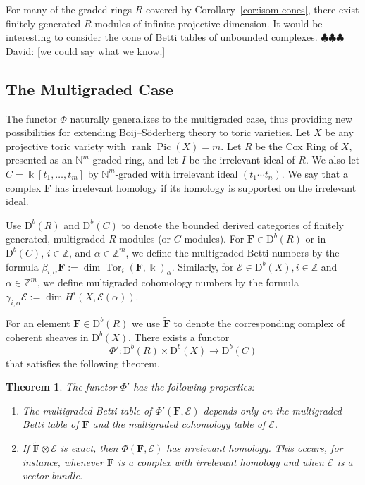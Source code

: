 \documentclass[12pt]{amsart}
\newtheorem{theorem}[lemma]{Theorem}
\theoremstyle{definition}
\theoremstyle{remark}
\newcommand{\Pic}{\operatorname{Pic}}
\newcommand{\Tor}{\operatorname{Tor}}
\newcommand{\kk}{\Bbbk}
\newcommand{\rank}{\operatorname{rank}}
\newcommand{\ZZ}{\mathbb{Z}}
\newcommand{\cE}{\mathcal{E}}
\newcommand{\FF}{\mathbf{F}}
\newcommand{\defi}[1]{\textsf{#1}} %
\newcommand{\DD}{\mathrm{D}}
\newcommand{\david}[1]{{\color{red} \sf $\clubsuit\clubsuit\clubsuit$ David: [#1]}}
\begin{document}
For many of the graded rings $R$ covered by Corollary~\ref{cor:isom cones}, there exist finitely generated $R$-modules of infinite projective dimension.  It would  be interesting to consider the cone of Betti tables of unbounded complexes. \david{we could say what we know.}

\subsection*{The Multigraded Case}
The functor $\Phi$ naturally generalizes to the multigraded case, thus providing new possibilities for extending Boij--S\"oderberg theory to toric varieties.  Let $X$ be any projective toric variety with $\rank \Pic(X)=m$.  Let $R$ be the Cox Ring of $X$, presented as an $\mathbb N^m$-graded ring, and let $I$ be the irrelevant ideal of $R$.  We also let $C=\kk[t_1, \dots, t_m]$ by $\mathbb N^m$-graded with irrelevant ideal $(t_1\cdots t_n)$.  We say that a complex $\FF$ has \defi{irrelevant homology} if its homology is supported on the irrelevant ideal.

Use $\DD^b(R)$ and $\DD^b(C)$ to denote the bounded derived categories of finitely generated, multigraded $R$-modules (or $C$-modules).   For $\FF\in \DD^b(R)$ or in $\DD^b(C)$, $i\in \ZZ$, and $\alpha\in \ZZ^m$, we define the multigraded Betti numbers by the formula $\beta_{i,\alpha} \FF:=\dim \Tor_i(\FF,\kk)_{\alpha}$.  Similarly, for $\cE\in \DD^b(X), i\in \ZZ$ and $\alpha\in \ZZ^m$, we define multigraded cohomology numbers by the formula $\gamma_{i,\alpha} \cE:=\dim H^i(X, \cE(\alpha))$.  


For an element $\FF\in \DD^b(R)$ we use $\widetilde{\FF}$ to denote the corresponding complex of coherent sheaves in $\DD^b(X)$.  There exists a functor
\[
\Phi': \DD^b(R)\times \DD^b(X)\to \DD^b(C)
\]
that satisfies the following theorem.
\begin{theorem}\label{thm:Phimulti}
The functor $\Phi'$ has the following  properties:
\begin{enumerate}
	\item\label{thm:Phi':1}  The multigraded Betti table of $\Phi'(\FF,\cE)$ depends only on the multigraded Betti table of $\FF$ and the multigraded cohomology table of $\cE$.
	\item\label{thm:Phi':2}  If $\widetilde{\FF}\otimes \cE$ is exact, then $\Phi(\FF,\cE)$ has irrelevant homology.  This occurs, for instance, whenever $\FF$ is a complex with irrelevant homology and when $\cE$ is a vector bundle.
\end{enumerate}
\end{theorem}
\end{document}
